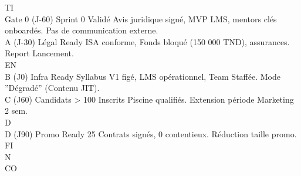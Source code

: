 \vspace{0.5em}
\vspace{0.5em}
\vspace{0.5em}
\vspace{0.5em}
TI\\
Gate 0 (J-60) Sprint 0 Validé Avis juridique signé, MVP LMS, mentors clés onboardés. Pas de communication externe.\\
A (J-30)      Légal Ready     ISA conforme, Fonds bloqué (150 000 TND), assurances. Report Lancement.\\
\vspace{0.5em}
\vspace{0.5em}
\vspace{0.5em}
\vspace{0.5em}
EN\\
B (J0)        Infra Ready     Syllabus V1 figé, LMS opérationnel, Team Staffée.      Mode ”Dégradé” (Contenu JIT).\\
C (J60)       Candidats       \textgreater{} 100 Inscrits Piscine qualifiés.                      Extension période Marketing 2 sem.\\
\vspace{0.5em}
\vspace{0.5em}
\vspace{0.5em}
\vspace{0.5em}
D\\
D (J90)       Promo Ready 25 Contrats signés, 0 contentieux.                         Réduction taille promo.\\
\vspace{0.5em}
\vspace{0.5em}
\vspace{0.5em}
\vspace{0.5em}
FI\\
N\\
CO\\
